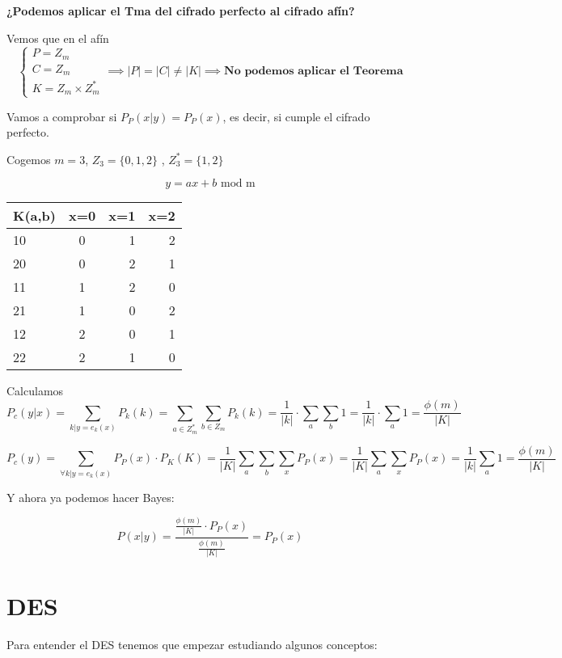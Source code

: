 \begin{example}
	
	\textbf{¿Podemos aplicar el Tma del cifrado perfecto al cifrado afín?}
	
	Vemos que en el afín
	$$\begin{cases}
	P = Z_m\\
	C= Z_m\\
	K = Z_m \times Z_m^*
	\end{cases} \implies|P| = |C| \neq |K| \implies \textbf{No podemos aplicar el Teorema}$$ 
	
	Vamos a comprobar si $P_P(x|y) = P_P(x)$, es decir, si cumple el cifrado perfecto.
	
	Cogemos $m = 3$, $Z_3 = \{0,1,2\}$ , $Z_3^* = \{1,2\}$
	
	\begin{center}
		$$y = ax + b \text{ mod m}$$
		\begin{tabular}{l | c | r | r}
			K(a,b) & x=0 & x=1 & x=2\\
			\hline
			10 & 0 & 1 & 2\\
			\hline
			20 & 0 & 2 & 1\\
			\hline
			11 & 1 & 2 & 0\\
			\hline
			21 & 1 & 0 & 2\\
			\hline
			12 & 2 & 0 & 1\\
			\hline
			22 & 2 & 1 & 0
			
		\end{tabular}
	\end{center}
	
	Calculamos $$P_c(y|x) = \sum_{k|y=e_k(x)} P_k(k) = \sum_{a\in Z_m^*}\sum_{b \in Z_m} P_k(k) = \frac{1}{|k|}\cdot \sum_a \sum_b 1 = \frac{1}{|k|}\cdot \sum_a 1 = \frac{\phi(m)}{|K|}$$
	
	$$P_c(y) = \sum_{\forall k|y=e_k(x)} P_P(x) \cdot P_K(K) = \frac{1}{|K|} \sum_a \sum_b \sum_x P_P(x) = \frac{1}{|K|} \sum_a \sum_x P_P(x) = \frac{1}{|k|} \sum_a 1 = \frac{\phi(m)}{|K|}$$
	
	Y ahora ya podemos hacer Bayes:
	
	$$P(x|y) = \frac{\frac{\phi(m)}{|K|}\cdot P_P(x)}{\frac{\phi(m)}{|K|}} = P_P(x)$$
\end{example}

\chapter{DES}
Para entender el DES tenemos que empezar estudiando algunos conceptos:

